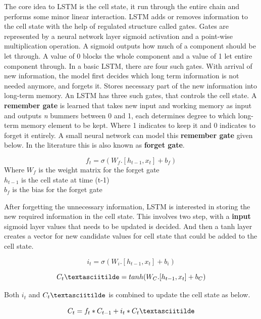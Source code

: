 The core idea to LSTM is the cell state, it run through the entire chain and performs some minor linear interaction. LSTM adds or removes information to the cell state with the help of regulated structure called gates. Gates are represented by a neural network layer sigmoid activation and a point-wise multiplication operation.
A sigmoid outputs how much of a component should be let through. A value of 0 blocks the whole component and a value of 1 let entire component through. In a basic LSTM, there are four such gates.
With arrival of new information, the model first decides which long term information is not needed anymore, and forgets it. Stores necessary part of the new information into long-term memory. An LSTM has three such gates, that controls the cell state.
A \textbf{remember gate} is learned that takes new input and working memory as input and outputs \textit{n} bummers between 0 and 1, each determines degree to which long-term memory element to be kept. Where 1 indicates to keep it and 0 indicates to forget it entirely. A small neural network can model this \textbf{remember gate} given below. In the literature this is also known as \textbf{forget gate}.

\begin{equation}
f_t = \sigma(W_f. [h_{t-1}, x_t  ] + b_f)
\end{equation}
Where $W_f$ is the weight matrix for the forget gate \\
$h_{t-1}$ is the cell state at time (t-1) \\
$b_f$ is the bias for the forget gate

After forgetting the unnecessary information, LSTM is interested in storing the new required information in the cell state. This involves two step, with a \textbf{input} sigmoid layer values that needs to be updated is decided. And then a tanh layer creates a vector for new candidate values for cell state that could be added to the cell state. 

\begin{equation}
i_t = \sigma(W_i. [h_{t-1}, x_t  ] + b_i)
\end{equation}

\begin{equation}
C_t\textasciitilde = tanh(W_C. [h_{t-1}, x_t ] + b_C)
\end{equation}

Both $i_t$ and $C_t\textasciitilde$ is combined to update the cell state as below.

\begin{equation}
C_t = f_t * C_{t-1} + i_t * C_t\textasciitilde
\end{equation}

